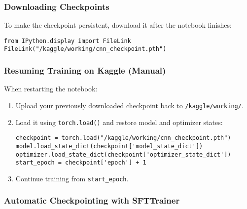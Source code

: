\subsubsection{Downloading Checkpoints}

To make the checkpoint persistent, download it after the notebook finishes:

\begin{tcolorbox}[colback=green!5!white, colframe=green!75!black, title=Download Example]
\begin{verbatim}
from IPython.display import FileLink
FileLink("/kaggle/working/cnn_checkpoint.pth")
\end{verbatim}
\end{tcolorbox}

\subsubsection{Resuming Training on Kaggle (Manual)}

When restarting the notebook:

\begin{enumerate}
    \item Upload your previously downloaded checkpoint back to \texttt{/kaggle/working/}.
    \item Load it using \texttt{torch.load()} and restore model and optimizer states:
    
\begin{tcolorbox}[colback=yellow!5!white, colframe=yellow!75!black, title=Example: SFTTrainer Automatic Checkpointing]
\begin{verbatim}
checkpoint = torch.load("/kaggle/working/cnn_checkpoint.pth")
model.load_state_dict(checkpoint['model_state_dict'])
optimizer.load_state_dict(checkpoint['optimizer_state_dict'])
start_epoch = checkpoint['epoch'] + 1
\end{verbatim}
\end{tcolorbox}

    \item Continue training from \texttt{start\_epoch}.
\end{enumerate}

\subsubsection{Automatic Checkpointing with SFTTrainer}

